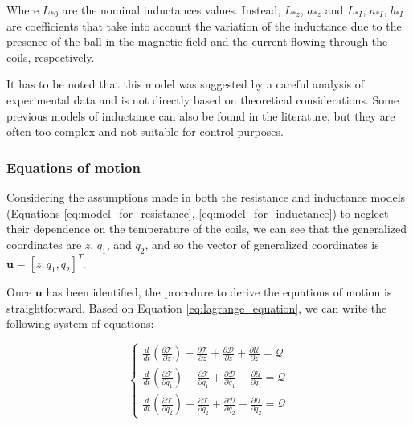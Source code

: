 Where $L_{*0}$ are the nominal inductances values.
Instead, $L_{*z}$, $a_{*z}$ and $L_{*I}$, $a_{*I}$, $b_{*I}$ are coefficients that take into account the variation of the inductance due to the presence of the ball in the magnetic field and the current flowing through the coils, respectively.

It has to be noted that this model was suggested by a careful analysis of experimental data and is not directly based on theoretical considerations.
Some previous models of inductance can also be found in the literature, but they are often too complex and not suitable for control purposes.



\subsubsection{Equations of motion}
\label{subsubsec:equations_of_motion}

Considering the assumptions made in both the resistance and inductance models (Equations \ref{eq:model_for_resistance}, \ref{eq:model_for_inductance}) to neglect their dependence on the temperature of the coils, we can see that the generalized coordinates are $z$, $q_1$, and $q_2$, and so the vector of generalized coordinates is $\mathbf{u} = [z, q_1, q_2]^T$.

Once $\mathbf{u}$ has been identified, the procedure to derive the equations of motion is straightforward.
Based on Equation \ref{eq:lagrange_equation}, we can write the following system of equations:

\begin{equation}
    \begin{cases}
        \frac{d}{dt} \left( \frac{\partial \mathcal{T}}{\partial \dot{z}} \right) - \frac{\partial \mathcal{T}}{\partial z} + \frac{\partial \mathcal{D}}{\partial \dot{z}} + \frac{\partial \mathcal{U}}{\partial z} = \mathcal{Q}         \\
        \frac{d}{dt} \left( \frac{\partial \mathcal{T}}{\partial \dot{q_1}} \right) - \frac{\partial \mathcal{T}}{\partial q_1} + \frac{\partial \mathcal{D}}{\partial \dot{q_1}} + \frac{\partial \mathcal{U}}{\partial q_1} = \mathcal{Q} \\
        \frac{d}{dt} \left( \frac{\partial \mathcal{T}}{\partial \dot{q_2}} \right) - \frac{\partial \mathcal{T}}{\partial q_2} + \frac{\partial \mathcal{D}}{\partial \dot{q_2}} + \frac{\partial \mathcal{U}}{\partial q_2} = \mathcal{Q}
    \end{cases}
\end{equation}

